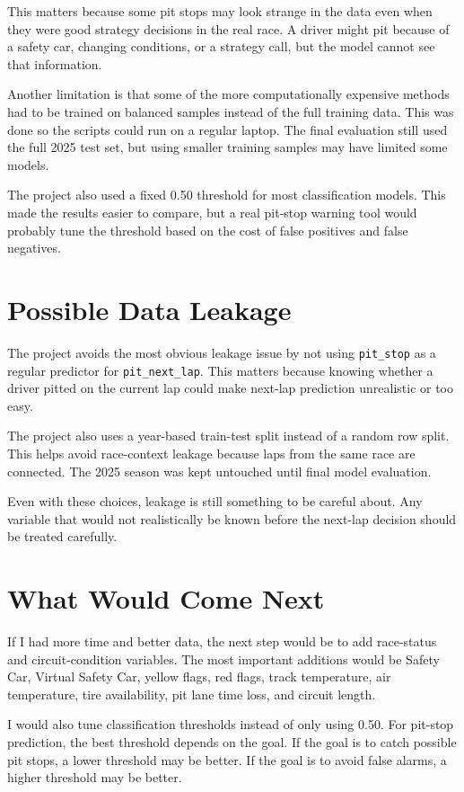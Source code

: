 \documentclass[11pt,oneside,openany]{book}
\begin{document}
This matters because some pit stops may look strange in the data even when they were good strategy decisions in the real race. A driver might pit because of a safety car, changing conditions, or a strategy call, but the model cannot see that information.

Another limitation is that some of the more computationally expensive methods had to be trained on balanced samples instead of the full training data. This was done so the scripts could run on a regular laptop. The final evaluation still used the full 2025 test set, but using smaller training samples may have limited some models.

The project also used a fixed 0.50 threshold for most classification models. This made the results easier to compare, but a real pit-stop warning tool would probably tune the threshold based on the cost of false positives and false negatives.

\section{Possible Data Leakage}

The project avoids the most obvious leakage issue by not using \texttt{pit\_stop} as a regular predictor for \texttt{pit\_next\_lap}. This matters because knowing whether a driver pitted on the current lap could make next-lap prediction unrealistic or too easy.

The project also uses a year-based train-test split instead of a random row split. This helps avoid race-context leakage because laps from the same race are connected. The 2025 season was kept untouched until final model evaluation.

Even with these choices, leakage is still something to be careful about. Any variable that would not realistically be known before the next-lap decision should be treated carefully.

\section{What Would Come Next}

If I had more time and better data, the next step would be to add race-status and circuit-condition variables. The most important additions would be Safety Car, Virtual Safety Car, yellow flags, red flags, track temperature, air temperature, tire availability, pit lane time loss, and circuit length.

I would also tune classification thresholds instead of only using 0.50. For pit-stop prediction, the best threshold depends on the goal. If the goal is to catch possible pit stops, a lower threshold may be better. If the goal is to avoid false alarms, a higher threshold may be better.
\end{document}
